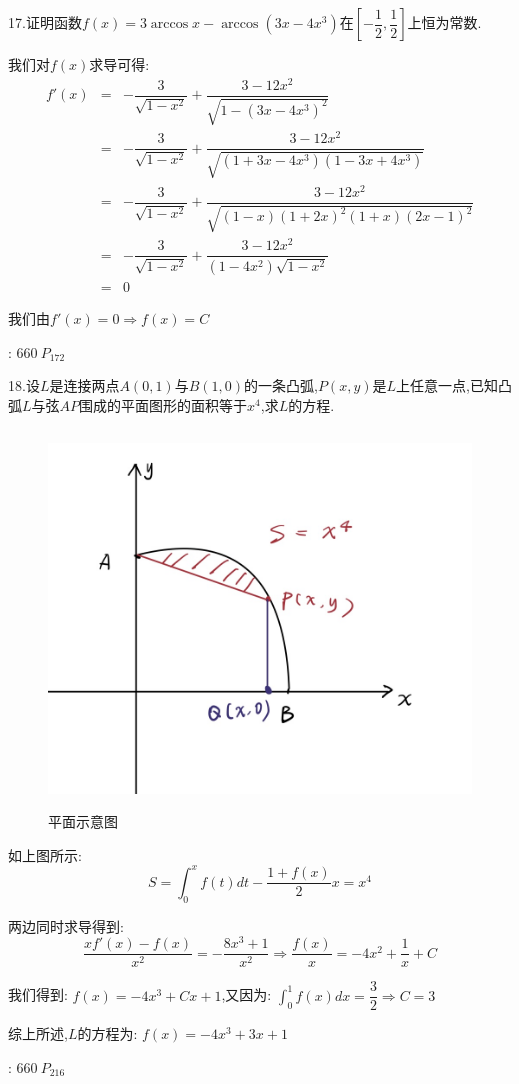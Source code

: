 17.证明函数$f(x)=3\arccos x-\arccos (3x-4x^3)$在$[-\dfrac{1}{2},\dfrac{1}{2}]$上恒为常数.
\begin{solution}
	
	我们对$f(x)$求导可得:  
	\begin{eqnarray*}
		f'(x)&=&-\dfrac{3}{\sqrt{1-x^2}}+\dfrac{3-12x^2}{\sqrt{1-(3x-4x^3)^2}}\\
		&=&-\dfrac{3}{\sqrt{1-x^2}}+\dfrac{3-12x^2}{\sqrt{(1+3x-4x^3)(1-3x+4x^3)}}\\
		&=&-\dfrac{3}{\sqrt{1-x^2}}+\dfrac{3-12x^2}{\sqrt{(1-x)(1+2x)^2(1+x)(2x-1)^2}}\\
		&=&-\dfrac{3}{\sqrt{1-x^2}}+\dfrac{3-12x^2}{(1-4x^2)\sqrt{1-x^2}}\\
		&=&0
	\end{eqnarray*}

	我们由$f'(x)=0\Rightarrow f(x)=C$
\end{solution}
\begin{anymark}[注]
	[题目来源]:  $660 \ P_{172}$
\end{anymark}

18.设$L$是连接两点$A(0,1)$与$B(1,0)$的一条凸弧,$P(x,y)$是$L$上任意一点,已知凸弧$L$与弦$AP$围成的平面图形的面积等于$x^4$,求$L$的方程.
\begin{figure}[htbp]
	\centering
	\includegraphics[width=15cm,height=10cm]{"figure/Summary/平面示意图.jpg"}
	\caption{平面示意图}
\end{figure} 
\begin{solution}
	
	如上图所示:  
	$$S=\int_{0}^{x}f(t)dt-\dfrac{1+f(x)}{2}x=x^4$$
	
	两边同时求导得到:  
	$$\dfrac{xf'(x)-f(x)}{x^2}=-\dfrac{8x^3+1}{x^2}\Rightarrow \dfrac{f(x)}{x}=-4x^2+\dfrac{1}{x}+C$$
	
	我们得到:  $f(x)=-4x^3+Cx+1$,又因为:  $\int_{0}^{1}f(x)dx=\dfrac{3}{2}\Rightarrow C=3$
	
	综上所述,$L$的方程为:  $f(x)=-4x^3+3x+1$
\end{solution}
\begin{anymark}[注]
	[题目来源]:  $660 \ P_{216}$
\end{anymark}

